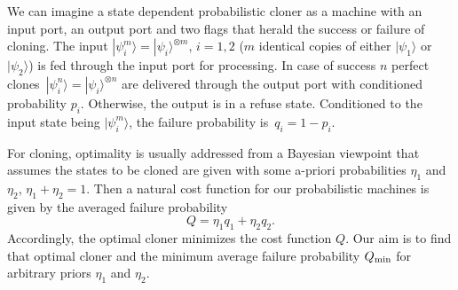 \documentclass[aps,prl,twocolumn,showpacs]{revtex4}
\begin{document}
We can imagine a state dependent probabilistic cloner as a machine with an input port, an output port and two flags that herald the success or failure of cloning.  The input $|\psi_i^m\rangle=|\psi_i\rangle^{\otimes m}$, $i=1,2$ ($m$ identical copies of either $|\psi_1\rangle$ or $|\psi_2\rangle$) is fed through the input port for processing. In case of success $n$ perfect clones~$|\psi_i^n\rangle=|\psi_i\rangle^{\otimes n}$  are delivered through the output port with conditioned probability $p_i$. Otherwise, the output is in a refuse state. Conditioned to the input state being $|\psi^m_i\rangle$, the failure probability is~$q_i=1-p_i$.

For cloning, optimality is usually addressed from a Bayesian viewpoint that assumes the states to be cloned are given with some a-priori  probabilities $\eta_1$ and $\eta_2$, $\eta_1+\eta_2=1$. Then a natural cost function for our probabilistic machines is given by the averaged failure probability 
%
\begin{equation}
Q=\eta_1 q_1+\eta_2 q_2.
\label{obj fun}
\end{equation}
%
Accordingly, the optimal cloner minimizes the cost function 
$Q$. Our aim is to find that optimal cloner and the minimum average failure probability $Q_{\rm min}$ for arbitrary priors $\eta_1$ and $\eta_2$.

%
%
\end{document}
